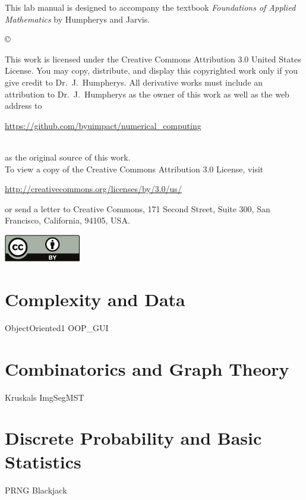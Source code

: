 \documentclass[nociteref]{newsiambook}
\begin{document}
\begin{thepreface}
This lab manual is designed to accompany the textbook \emph{Foundations of Applied Mathematics} by Humpherys and Jarvis.

\vfill
\copyright{This work is licensed under the Creative Commons Attribution 3.0 United States 
License.  You may copy, distribute, and display this copyrighted work only if you give 
credit to Dr.~J.~Humpherys. All derivative works must include an attribution to Dr.~J.~Humpherys as the owner of this work as well as the web address to 
\\\centerline{\url{https://github.com/byuimpact/numerical_computing}}\\ as the original source of 
this 
work.\\To view a copy of the Creative Commons Attribution 3.0 License, 
visit\\\centerline{\url{http://creativecommons.org/licenses/by/3.0/us/}} or send a letter to 
Creative Commons, 171 Second Street, Suite 300, San Francisco, California, 94105, USA.}

\vfill
\centering\includegraphics[height=1.2cm]{by}
\vfill
\end{thepreface}

\setcounter{tocdepth}{1}
\tableofcontents

\mainmatter

\part{Complexity and Data}


{ObjectOriented1}
{OOP_GUI}

\part{Combinatorics and Graph Theory}
{Kruskals}
{ImgSegMST}

\part{Discrete Probability and Basic Statistics}
{PRNG}
{Blackjack}
\end{document}

